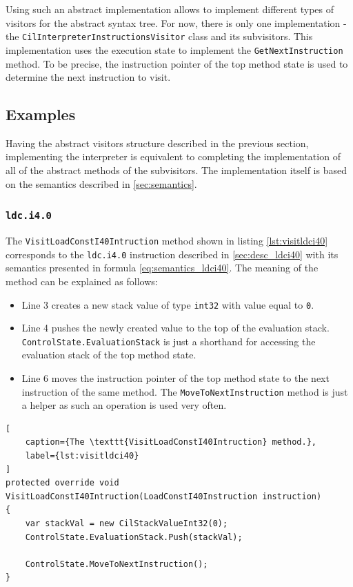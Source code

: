 \documentclass{article}
\numberwithin{equation}{section}
\begin{document}
Using such an abstract implementation allows to implement different types of visitors for the abstract syntax tree. For now, there is only one implementation - the \texttt{CilInterpreterInstructionsVisitor} class and its subvisitors. This implementation uses the execution state to implement the \texttt{GetNextInstruction} method. To be precise, the instruction pointer of the top method state is used to determine the next instruction to visit.

\subsection{Examples}

Having the abstract visitors structure described in the previous section, implementing the interpreter is equivalent to completing the implementation of all of the abstract methods of the subvisitors. The implementation itself is based on the semantics described in \ref{sec:semantics}.

\subsubsection{\texttt{ldc.i4.0}}

The \texttt{VisitLoadConstI40Intruction} method shown in listing \ref{lst:visitldci40} corresponds to the \texttt{ldc.i4.0} instruction described in \ref{sec:desc_ldci40} with its semantics presented in formula \ref{eq:semantics_ldci40}. The meaning of the method can be explained as follows:
\begin{itemize}
	\item{Line 3 creates a new stack value of type \texttt{int32} with value equal to \texttt{0}.}
	\item{Line 4 pushes the newly created value to the top of the evaluation stack. \texttt{ControlState.EvaluationStack} is just a shorthand for accessing the evaluation stack of the top method state.}
	\item{Line 6 moves the instruction pointer of the top method state to the next instruction of the same method. The \texttt{MoveToNextInstruction} method is just a helper as such an operation is used very often.}
\end{itemize}

\begin{lstlisting}[
	caption={The \texttt{VisitLoadConstI40Intruction} method.},
	label={lst:visitldci40}
]
protected override void VisitLoadConstI40Intruction(LoadConstI40Instruction instruction)
{
	var stackVal = new CilStackValueInt32(0);
	ControlState.EvaluationStack.Push(stackVal);

	ControlState.MoveToNextInstruction();
}
\end{lstlisting}
\end{document}
